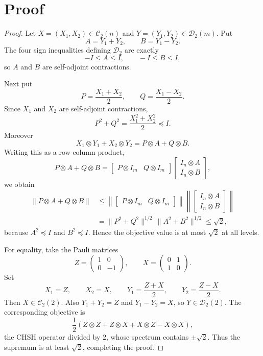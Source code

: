 \documentclass[11pt]{article}
\newcommand{\cD}{\mathcal D}
\newcommand{\cC}{\mathcal C}
\begin{document}
\section*{Proof}

\begin{proof}
Let \(X=(X_1,X_2)\in\cC_2(n)\) and \(Y=(Y_1,Y_2)\in\cD_2(m)\).  Put
\[
  A=Y_1+Y_2,\qquad B=Y_1-Y_2.
\]
The four sign inequalities defining \(\cD_2\) are exactly
\[
  -I\le A\le I,\qquad -I\le B\le I,
\]
so \(A\) and \(B\) are self-adjoint contractions.

Next put
\[
  P=\frac{X_1+X_2}{2},\qquad Q=\frac{X_1-X_2}{2}.
\]
Since \(X_1\) and \(X_2\) are self-adjoint contractions,
\[
  P^2+Q^2
  =\frac{X_1^2+X_2^2}{2}
  \preceq I.
\]
Moreover
\[
  X_1\otimes Y_1+X_2\otimes Y_2
  =P\otimes A+Q\otimes B.
\]
Writing this as a row-column product,
\[
  P\otimes A+Q\otimes B
  =
  \begin{bmatrix}P\otimes I_m & Q\otimes I_m\end{bmatrix}
  \begin{bmatrix}I_n\otimes A\\ I_n\otimes B\end{bmatrix},
\]
we obtain
\[
\begin{aligned}
  \|P\otimes A+Q\otimes B\|
  &\le
  \left\|
  \begin{bmatrix}P\otimes I_m & Q\otimes I_m\end{bmatrix}
  \right\|
  \left\|
  \begin{bmatrix}I_n\otimes A\\ I_n\otimes B\end{bmatrix}
  \right\|  \\
  &=\|P^2+Q^2\|^{1/2}\,\|A^2+B^2\|^{1/2}
  \le \sqrt2,
\end{aligned}
\]
because \(A^2\preceq I\) and \(B^2\preceq I\).  Hence the objective value is at
most \(\sqrt2\) at all levels.

For equality, take the Pauli matrices
\[
  Z=\begin{pmatrix}1&0\\0&-1\end{pmatrix},
  \qquad
  X=\begin{pmatrix}0&1\\1&0\end{pmatrix}.
\]
Set
\[
  X_1=Z,\qquad X_2=X,\qquad
  Y_1=\frac{Z+X}{2},\qquad
  Y_2=\frac{Z-X}{2}.
\]
Then \(X\in\cC_2(2)\).  Also \(Y_1+Y_2=Z\) and \(Y_1-Y_2=X\), so
\(Y\in\cD_2(2)\).  The corresponding objective is
\[
  \frac12\left(Z\otimes Z+Z\otimes X+X\otimes Z-X\otimes X\right),
\]
the CHSH operator divided by \(2\), whose spectrum contains \(\pm\sqrt2\).
Thus the supremum is at least \(\sqrt2\), completing the proof.
\end{proof}
\end{document}
